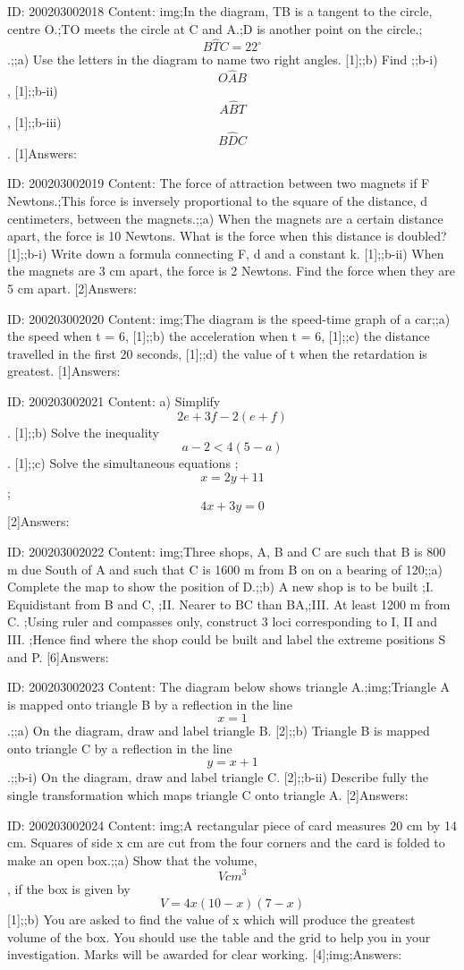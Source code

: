 \documentclass{article}
\begin{document}
ID: 200203002018
Content:
img;In the diagram, TB is a tangent to the circle, centre O.;TO meets the circle at C and A.;D is another point on the circle.;$$B \hat TC = 22^{\circ}$$.;;a) Use the letters in the diagram to name two right angles.   [1];;b) Find ;;b-i) $$O \hat AB$$,   [1];;b-ii) $$A \hat BT$$,   [1];;b-iii) $$B \hat DC$$.   [1]Answers:

ID: 200203002019
Content:
The force of attraction between two magnets if F Newtons.;This force is inversely proportional to the square of the distance, d centimeters, between the magnets.;;a) When the magnets are a certain distance apart, the force is 10 Newtons. What is the force when this distance is doubled?   [1];;b-i) Write down a formula connecting F, d and a constant k.   [1];;b-ii) When the magnets are 3 cm apart, the force is 2 Newtons. Find the force when they are 5 cm apart.   [2]Answers:

ID: 200203002020
Content:
img;The diagram is the speed-time graph of a car;;a) the speed when t = 6,   [1];;b) the acceleration when t = 6,   [1];;c) the distance travelled in the first 20 seconds,   [1];;d) the value of t when the retardation is greatest.   [1]Answers:

ID: 200203002021
Content:
a) Simplify $$2e + 3f - 2(e + f)$$.   [1];;b) Solve the inequality $$a - 2 < 4 (5 - a)$$.   [1];;c) Solve the simultaneous equations ;$$x = 2y + 11$$;$$4x + 3y = 0$$ [2]Answers:

ID: 200203002022
Content:
img;Three shops, A, B and C are such that B is 800 m due South of A and such that C is 1600 m from B on on a bearing of 120;;a) Complete the map to show the position of D.;;b) A new shop is to be built ;I. Equidistant from B and C, ;II. Nearer to BC than BA,;III. At least 1200 m from C. ;Using ruler and compasses only, construct 3 loci corresponding to I, II and III. ;Hence find where the shop could be built and label the extreme positions S and P. [6]Answers:

ID: 200203002023
Content:
The diagram below shows triangle A.;img;Triangle A is mapped onto triangle B by a reflection in the line $$x = 1$$.;;a) On the diagram, draw and label triangle B.      [2];;b) Triangle B is mapped onto triangle C by a reflection in the line $$y = x + 1$$.;;b-i) On the diagram, draw and label triangle C.   [2];;b-ii) Describe fully the single transformation which maps triangle C onto triangle A.   [2]Answers:

ID: 200203002024
Content:
img;A rectangular piece of card measures 20 cm by 14 cm. Squares of side x cm are cut from the four corners and the card is folded to make an open box.;;a) Show that the volume, $$V cm^3$$, if the box is given by $$V = 4x(10 - x)(7 - x)$$ [1];;b) You are asked to find the value of x which will produce the greatest volume of the box. You should use the table and the grid to help you in your investigation. Marks will be awarded for clear working.   [4];img;Answers:
\end{document}
